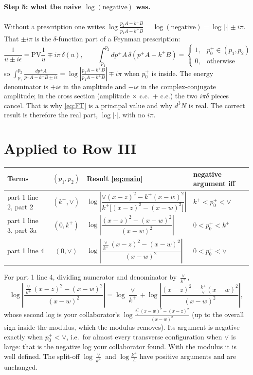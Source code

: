 \documentclass[11pt]{article}
\numberwithin{equation}{section}
\newcommand{\PV}{\mathrm{PV}}
\begin{document}
\paragraph{Step 5: what the naive $\log(\text{negative})$ was.} Without a prescription one writes $\log\frac{p_2A-k^+B}{p_1A-k^+B}=\log(\text{negative})=\log|\cdot|\pm i\pi$. That $\pm i\pi$ is the $\delta$-function part of a Feynman prescription:
\begin{equation}
\frac{1}{u\pm i\epsilon}=\PV\frac1u\mp i\pi\,\delta(u),\qquad
\int_{p_1}^{p_2}dp^+A\,\delta(p^+A-k^+B)=\begin{cases}1,&p_0^+\in(p_1,p_2)\\0,&\text{otherwise}\end{cases}
\end{equation}
so $\int_{p_1}^{p_2}\frac{dp^+A}{p^+A-k^+B\pm i\epsilon}=\log\left|\frac{p_2A-k^+B}{p_1A-k^+B}\right|\mp i\pi$ when $p_0^+$ is inside.
The energy denominator is $+i\epsilon$ in the amplitude and $-i\epsilon$ in the complex-conjugate amplitude; in the cross section (amplitude $\times$ c.c.\ $+$ c.c.) the two $i\pi\delta$ pieces cancel. That is why \eqref{eq:FT} is a principal value and why $d^3N$ is real. The correct result is therefore the real part, $\log|\cdot|$, with no $i\pi$.

\section{Applied to Row III}
\begin{center}
\renewcommand{\arraystretch}{1.6}
\begin{tabular}{@{}l c l l@{}}
\toprule
Terms & $(p_1,p_2)$ & Result \eqref{eq:main} & negative argument iff\\\midrule
part 1 line 2, part 2 & $(k^+,\vee)$ & $\log\left|\dfrac{\vee(x-z)^2-k^+(x-w)^2}{k^+\big[(x-z)^2-(x-w)^2\big]}\right|$ & $k^+<p_0^+<\vee$\\
part 1 line 3, part 3a & $(0,k^+)$ & $\log\left|\dfrac{(x-z)^2-(x-w)^2}{(x-w)^2}\right|$ & $0<p_0^+<k^+$\\
part 1 line 4 & $(0,\vee)$ & $\log\left|\dfrac{\frac{\vee}{k^+}(x-z)^2-(x-w)^2}{(x-w)^2}\right|$ & $0<p_0^+<\vee$\\
\bottomrule
\end{tabular}
\end{center}
For part 1 line 4, dividing numerator and denominator by $\frac{\vee}{k^+}$,
\begin{equation}
\log\left|\frac{\frac{\vee}{k^+}(x-z)^2-(x-w)^2}{(x-w)^2}\right|=\log\frac{\vee}{k^+}+\log\left|\frac{(x-z)^2-\frac{k^+}{\vee}(x-w)^2}{(x-w)^2}\right|,
\end{equation}
whose second log is your collaborator's $\log\frac{\frac{k^+}{\vee}(x-w)^2-(x-z)^2}{(x-w)^2}$ (up to the overall sign inside the modulus, which the modulus removes). Its argument is negative exactly when $p_0^+<\vee$, i.e.\ for almost every transverse configuration when $\vee$ is large: that is the negative log your collaborator found. With the modulus it is well defined. The split-off $\log\frac{\vee}{k^+}$ and $\log\frac{k^+}{\Lambda}$ have positive arguments and are unchanged.
\end{document}
